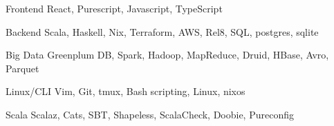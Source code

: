 

\begin{cvskills}

  \cvskill
    {Frontend}
    {React, Purescript, Javascript, TypeScript}

  \cvskill
    {Backend}
    {Scala, Haskell, Nix, Terraform, AWS, Rel8, SQL, postgres, sqlite}

  \cvskill
    {Big Data}
    {Greenplum DB, Spark, Hadoop, MapReduce, Druid, HBase, Avro, Parquet}

  \cvskill
    {Linux/CLI}
    {Vim, Git, tmux, Bash scripting, Linux, nixos}

  \cvskill
    {Scala}
    {Scalaz, Cats, SBT, Shapeless, ScalaCheck, Doobie, Pureconfig}

\end{cvskills}
